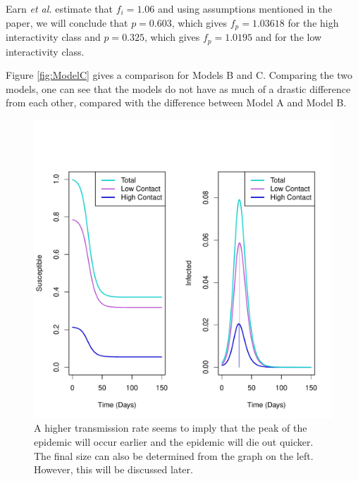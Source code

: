 \documentclass[a4paper, 12pt, journal]{ieeeconf}\usepackage[]{graphicx}\usepackage[]{color}
\makeatletter
\def\maxwidth{ %
  \ifdim\Gin@nat@width>\linewidth
    \linewidth
  \else
    \Gin@nat@width
  \fi
}
\newenvironment{knitrout}{}{} %
\makeatother
\begin{document}
Earn \textit{et al.} estimate that $f_i = 1.06$ and using assumptions mentioned in the paper, we will conclude that $p = 0.603$, which gives $f_p = 1.03618$ for the high interactivity class and $p=0.325$, which gives $f_p = 1.0195$ and for the low interactivity class.

Figure \ref{fig:ModelC} gives a comparison for Models B and C. Comparing the two models, one can see that the models do not have as much of a drastic difference from each other, compared with the difference between Model A and Model B. 






\begin{knitrout}
\color{fgcolor}\begin{figure}[thpb]
\includegraphics[width=\maxwidth]{figure/R_B-1} \caption{\label{fig:contact}A higher transmission rate seems to imply that the peak of the epidemic will occur earlier and the epidemic will die out quicker. The final size can also be determined from the graph on the left. However, this will be discussed later.}\label{fig:R_B}
\end{figure}


\end{knitrout}
\end{document}
